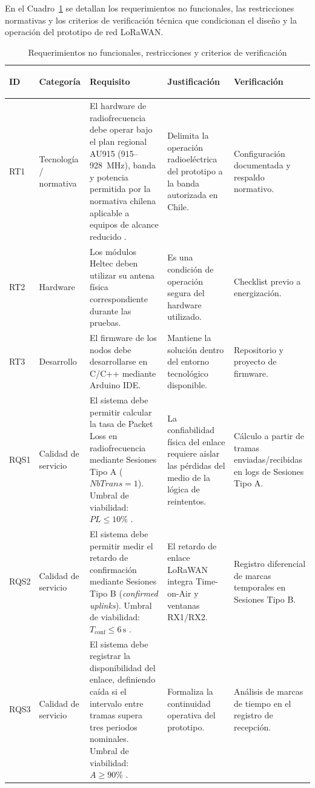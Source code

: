 \documentclass[12pt,oneside,openany,spanish,oldfontcommands]{memoir}
\renewcommand{\arraystretch}{1.15}
\begin{document}
En el Cuadro~\ref{tab:rnf} se detallan los requerimientos no funcionales, las restricciones
normativas y los criterios de verificación técnica que condicionan el diseño y la
operación del prototipo de red LoRaWAN.

\begin{table}[H]
\centering
\caption{Requerimientos no funcionales, restricciones y criterios de verificación}
\label{tab:rnf}
\scriptsize
\setlength{\tabcolsep}{3.5pt}
\renewcommand{\arraystretch}{1.0}
\begin{tabularx}{\textwidth}{
  >{\bfseries\raggedright\arraybackslash}p{0.85cm}
  >{\raggedright\arraybackslash}p{1.6cm}
  >{\raggedright\arraybackslash}X
  >{\raggedright\arraybackslash}p{2.5cm}
  >{\raggedright\arraybackslash}p{2.1cm}
}
\toprule
\textbf{ID} &
\textbf{Categoría} &
\textbf{Requisito} &
\textbf{Justificación} &
\textbf{Verificación}\\
\midrule
RT1 &
Tecnología / normativa &
El hardware de radiofrecuencia debe operar bajo el plan regional AU915 (915--928~MHz),
banda y potencia permitida por la normativa chilena aplicable a equipos de alcance reducido
\parencite{subtel2017}.
&
Delimita la operación radioeléctrica del prototipo a la banda autorizada en Chile.
&
Configuración documentada y respaldo normativo.
\\
\midrule
RT2 &
Hardware &
Los módulos Heltec deben utilizar su antena física correspondiente durante las pruebas.
&
Es una condición de operación segura del hardware utilizado.
&
Checklist previo a energización.
\\
\midrule
RT3 &
Desarrollo &
El firmware de los nodos debe desarrollarse en C/C++ mediante Arduino IDE.
&
Mantiene la solución dentro del entorno tecnológico disponible.
&
Repositorio y proyecto de firmware.
\\
\midrule
RQS1 &
Calidad de servicio &
El sistema debe permitir calcular la tasa de Packet Loss en radiofrecuencia mediante
Sesiones Tipo A ($NbTrans = 1$). Umbral de viabilidad: $PL \leq 10\%$
\parencite{kaur2024campus,ahmed2024vegetacion}.
&
La confiabilidad física del enlace requiere aislar las pérdidas del medio de la lógica de reintentos.
&
Cálculo a partir de tramas enviadas/recibidas en logs de Sesiones Tipo A.
\\
\midrule
RQS2 &
Calidad de servicio &
El sistema debe permitir medir el retardo de confirmación mediante Sesiones Tipo B
(\emph{confirmed uplinks}). Umbral de viabilidad: $T_{\mathrm{conf}} \leq 6\,\text{s}$
\parencite{lorawan1_0_4}.
&
El retardo de enlace LoRaWAN integra Time-on-Air y ventanas RX1/RX2.
&
Registro diferencial de marcas temporales en Sesiones Tipo B.
\\
\midrule
RQS3 &
Calidad de servicio &
El sistema debe registrar la disponibilidad del enlace, definiendo caída si el intervalo
entre tramas supera tres periodos nominales. Umbral de viabilidad: $A \geq 90\%$
\parencite{barrachina2023campus}.
&
Formaliza la continuidad operativa del prototipo.
&
Análisis de marcas de tiempo en el registro de recepción.
\\
\bottomrule
\end{tabularx}
\end{table}
\end{document}
